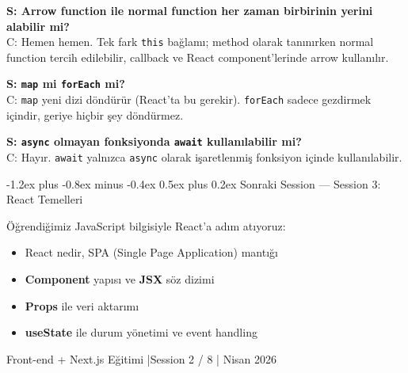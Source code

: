 \documentclass[12pt, a4paper]{article}
\makeatletter
\renewcommand{\subsection}{%
  \@startsection{subsection}{2}{\z@}%
    {-1.2ex plus -0.8ex minus -0.4ex}%
    {0.5ex plus 0.2ex}%
    {\normalfont\large\bfseries\sffamily\color{secondary}}%
}
\makeatother
\begin{document}
\begin{warningbox}
\textbf{S: Arrow function ile normal function her zaman birbirinin yerini alabilir mi?}\\
C: Hemen hemen. Tek fark \texttt{this} bağlamı; method olarak tanınırken normal function tercih edilebilir, callback ve React component'lerinde arrow kullanılır.

\vspace{6pt}
\textbf{S: \texttt{map} mi \texttt{forEach} mi?}\\
C: \texttt{map} yeni dizi döndürür (React'ta bu gerekir). \texttt{forEach} sadece gezdirmek içindir, geriye hiçbir şey döndürmez.

\vspace{6pt}
\textbf{S: \texttt{async} olmayan fonksiyonda \texttt{await} kullanılabilir mi?}\\
C: Hayır. \texttt{await} yalnızca \texttt{async} olarak işaretlenmiş fonksiyon içinde kullanılabilir.
\end{warningbox}

\vspace{6pt}

\subsection{Sonraki Session --- Session 3: React Temelleri}

\begin{infobox}
Öğrendiğimiz JavaScript bilgisiyle React'a adım atıyoruz:
\begin{itemize}
  \item React nedir, SPA (Single Page Application) mantığı
  \item \textbf{Component} yapısı ve \textbf{JSX} söz dizimi
  \item \textbf{Props} ile veri aktarımı
  \item \textbf{useState} ile durum yönetimi ve event handling
\end{itemize}
\end{infobox}

\vspace{16pt}
\begin{center}
  \color{gray}\sffamily\small
  Front-end + Next.js Eğitimi \quad|\quad Session 2 / 8 \quad| Nisan 2026
\end{center}
\end{document}
